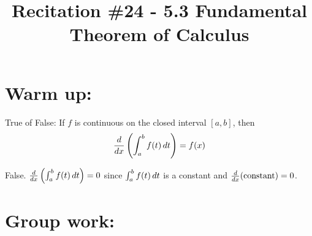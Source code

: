 \documentclass[handout,nooutcomes]{ximera}
\title{Recitation \#24 - 5.3 Fundamental Theorem of Calculus}
\begin{document}
\begin{abstract}		\end{abstract}
\maketitle

\section*{Warm up:} 
True of False:  If $f$ is continuous on the closed interval $[a,b]$, then 
$$\frac{d}{dx} \left( \int_a^b f(t) \,d t \right) = f(x)$$
		\begin{freeResponse}
		False.  $\frac{d}{dx} \left( \int_a^b f(t) \,d t \right) = 0$ since $\int_a^b f(t) \,d t$ is a constant and $\frac{d}{dx} (\text{constant}) = 0$.
		\end{freeResponse}	
		
		
		

	
	
	
	
	

\section*{Group work:}
\end{document}
